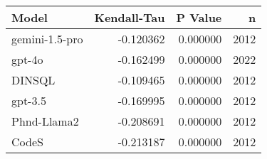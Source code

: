 \begin{tabular}{lrrr}
\toprule
Model & Kendall-Tau & P Value & n \\
\midrule
gemini-1.5-pro & -0.120362 & 0.000000 & 2012 \\
gpt-4o & -0.162499 & 0.000000 & 2022 \\
DINSQL & -0.109465 & 0.000000 & 2012 \\
gpt-3.5 & -0.169995 & 0.000000 & 2012 \\
Phnd-Llama2 & -0.208691 & 0.000000 & 2012 \\
CodeS & -0.213187 & 0.000000 & 2012 \\
\bottomrule
\end{tabular}
